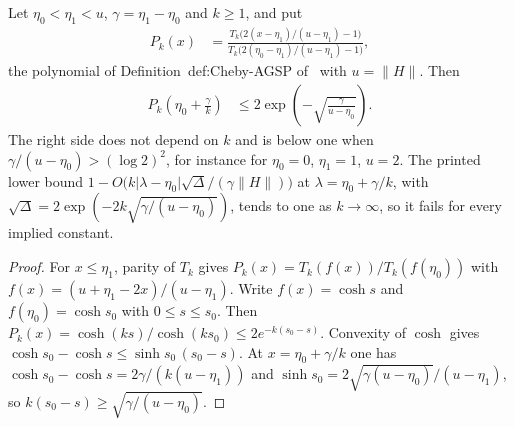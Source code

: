\begin{theorem}
    \label{thm:chebyshev_printed_slope_fails}
    \leanok
    Let $\eta_0<\eta_1<u$, $\gamma=\eta_1-\eta_0$ and $k\ge1$, and put
    \begin{align}
        P_k(x) & =\frac{T_k\bigl(2(x-\eta_1)/(u-\eta_1)-1\bigr)}
                  {T_k\bigl(2(\eta_0-\eta_1)/(u-\eta_1)-1\bigr)},
        \label{eq:chebyshev_source_polynomial}
    \end{align}
    the polynomial of Definition~def:Cheby-AGSP
    of~\cite[lines 795--801]{Arad2016RigorousRG} with $u=\|H\|$. Then
    \begin{align}
        P_k\left(\eta_0+\frac\gamma k\right)
         & \le2\exp\left(-\sqrt{\frac{\gamma}{u-\eta_0}}\right).
        \label{eq:chebyshev_printed_slope_fails}
    \end{align}
    The right side does not depend on $k$ and is below one when
    $\gamma/(u-\eta_0)>(\log2)^2$, for instance for $\eta_0=0$, $\eta_1=1$,
    $u=2$. The printed lower bound
    $1-O\bigl(k\lvert\lambda-\eta_0\rvert\sqrt\Delta/(\gamma\|H\|)\bigr)$ at
    $\lambda=\eta_0+\gamma/k$, with
    $\sqrt\Delta=2\exp(-2k\sqrt{\gamma/(u-\eta_0)})$, tends to one as
    $k\to\infty$, so it fails for every implied constant.
\end{theorem}
\begin{proof}\leanok
    For $x\le\eta_1$, parity of $T_k$ gives $P_k(x)=T_k(f(x))/T_k(f(\eta_0))$
    with $f(x)=(u+\eta_1-2x)/(u-\eta_1)$. Write $f(x)=\cosh s$ and
    $f(\eta_0)=\cosh s_0$ with $0\le s\le s_0$. Then
    $P_k(x)=\cosh(ks)/\cosh(ks_0)\le2e^{-k(s_0-s)}$. Convexity of $\cosh$
    gives $\cosh s_0-\cosh s\le\sinh s_0\,(s_0-s)$. At $x=\eta_0+\gamma/k$
    one has $\cosh s_0-\cosh s=2\gamma/(k(u-\eta_1))$ and
    $\sinh s_0=2\sqrt{\gamma(u-\eta_0)}/(u-\eta_1)$, so
    $k(s_0-s)\ge\sqrt{\gamma/(u-\eta_0)}$.
\end{proof}

